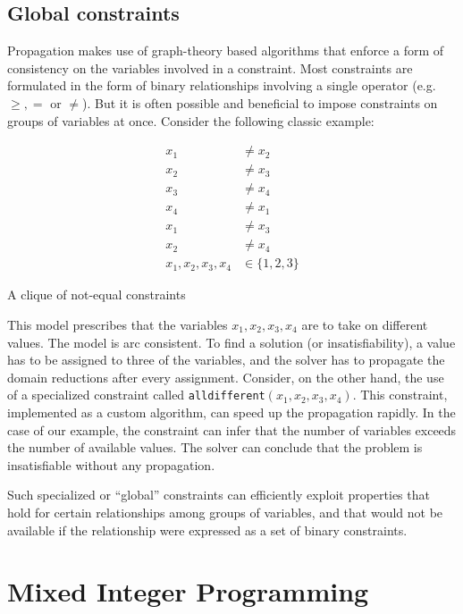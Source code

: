 \documentclass[13pt, letterpaper, oneside]{book}
\begin{document}
\subsection{Global constraints}
Propagation makes use of graph-theory based algorithms that enforce a form of
consistency on the variables involved in a constraint. Most constraints are
formulated in the form of binary relationships involving a single operator (e.g.
$\geq, =$ or $\neq$). But it is often possible and beneficial to impose
constraints on groups of variables at once. Consider the following classic
example:
\begin{model}[h!]
\begin{align}
x_1 &\neq x_2\\
x_2 &\neq x_3\\
x_3 &\neq x_4\\
x_4 &\neq x_1\\
x_1 &\neq x_3\\
x_2 &\neq x_4\\
x_1, x_2, x_3, x_4 &\in \{1, 2, 3\}
\end{align}
\caption{A clique of not-equal constraints}
\label{mod:cpalldiff}
\end{model}
This model prescribes that the variables $x_1, x_2, x_3, x_4$ are to take on
different values. The model is arc consistent. To find a solution (or
insatisfiability), a value has to be assigned to three of the variables, and the
solver has to propagate the domain reductions after every assignment. Consider,
on the other hand, the use of a specialized constraint called
\texttt{alldifferent}$(x_1, x_2, x_3, x_4)$. This constraint, implemented as a
custom algorithm, can speed up the propagation rapidly. In the case of our
example, the constraint can infer that the number of variables exceeds the
number of available values. The solver can conclude that the problem is
insatisfiable without any propagation.

Such specialized or ``global'' constraints can efficiently exploit properties
that hold for certain relationships among groups of variables, and that would
not be available if the relationship were expressed as a set of binary
constraints.
 
\section{Mixed Integer Programming}
\end{document}
